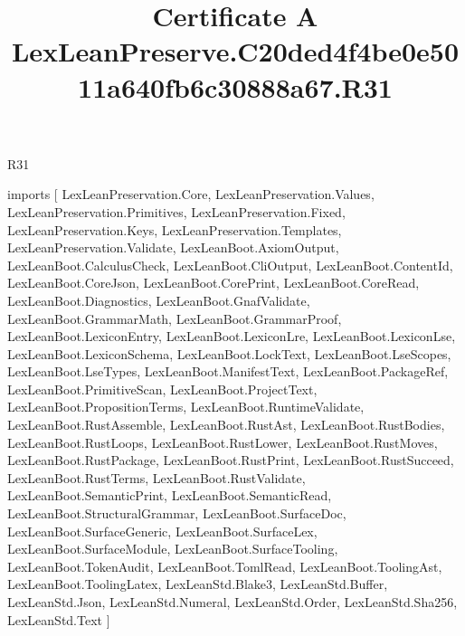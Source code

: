 \begin{lexlean}{R31}
\title{Certificate A LexLeanPreserve.C20ded4f4be0e5011a640fb6c30888a67.R31}
\begin{coremodule}
imports [
  LexLeanPreservation.Core,
  LexLeanPreservation.Values,
  LexLeanPreservation.Primitives,
  LexLeanPreservation.Fixed,
  LexLeanPreservation.Keys,
  LexLeanPreservation.Templates,
  LexLeanPreservation.Validate,
  LexLeanBoot.AxiomOutput,
  LexLeanBoot.CalculusCheck,
  LexLeanBoot.CliOutput,
  LexLeanBoot.ContentId,
  LexLeanBoot.CoreJson,
  LexLeanBoot.CorePrint,
  LexLeanBoot.CoreRead,
  LexLeanBoot.Diagnostics,
  LexLeanBoot.GnafValidate,
  LexLeanBoot.GrammarMath,
  LexLeanBoot.GrammarProof,
  LexLeanBoot.LexiconEntry,
  LexLeanBoot.LexiconLre,
  LexLeanBoot.LexiconLse,
  LexLeanBoot.LexiconSchema,
  LexLeanBoot.LockText,
  LexLeanBoot.LseScopes,
  LexLeanBoot.LseTypes,
  LexLeanBoot.ManifestText,
  LexLeanBoot.PackageRef,
  LexLeanBoot.PrimitiveScan,
  LexLeanBoot.ProjectText,
  LexLeanBoot.PropositionTerms,
  LexLeanBoot.RuntimeValidate,
  LexLeanBoot.RustAssemble,
  LexLeanBoot.RustAst,
  LexLeanBoot.RustBodies,
  LexLeanBoot.RustLoops,
  LexLeanBoot.RustLower,
  LexLeanBoot.RustMoves,
  LexLeanBoot.RustPackage,
  LexLeanBoot.RustPrint,
  LexLeanBoot.RustSucceed,
  LexLeanBoot.RustTerms,
  LexLeanBoot.RustValidate,
  LexLeanBoot.SemanticPrint,
  LexLeanBoot.SemanticRead,
  LexLeanBoot.StructuralGrammar,
  LexLeanBoot.SurfaceDoc,
  LexLeanBoot.SurfaceGeneric,
  LexLeanBoot.SurfaceLex,
  LexLeanBoot.SurfaceModule,
  LexLeanBoot.SurfaceTooling,
  LexLeanBoot.TokenAudit,
  LexLeanBoot.TomlRead,
  LexLeanBoot.ToolingAst,
  LexLeanBoot.ToolingLatex,
  LexLeanStd.Blake3,
  LexLeanStd.Buffer,
  LexLeanStd.Json,
  LexLeanStd.Numeral,
  LexLeanStd.Order,
  LexLeanStd.Sha256,
  LexLeanStd.Text
]


\end{coremodule}
\end{lexlean}
